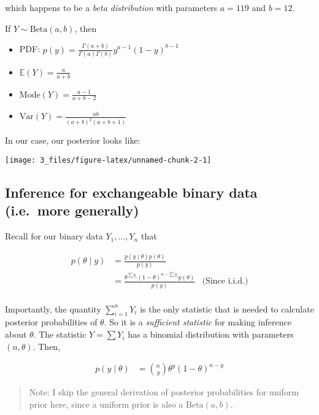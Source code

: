 \documentclass[]{article}
\providecommand{\tightlist}{%
  \setlength{\itemsep}{0pt}\setlength{\parskip}{0pt}}
\begin{document}
which happens to be a \emph{beta distribution} with parameters
\(a = 119\) and \(b = 12\).

If \(Y \sim \text{Beta}(a, b)\), then

\begin{itemize}
\tightlist
\item
  PDF:
  \(p(y) = \frac{\Gamma(a + b)}{\Gamma(a)\Gamma(b)} y^{a - 1} (1 - y)^{b - 1}\)
\item
  \(\mathbb{E}(Y) = \frac{a}{a + b}\)
\item
  \(\text{Mode}(Y) = \frac{a - 1}{a + b - 2}\)
\item
  \(\text{Var}(Y) = \frac{ab}{(a + b)^2 (a + b + 1)}\)
\end{itemize}

In our case, our posterior looks like:

\begin{center}\texttt{[image: 3\_files/figure-latex/unnamed-chunk-2-1]} \end{center}

\hypertarget{inference-for-exchangeable-binary-data-i.e.more-generally}{%
\subsection{Inference for exchangeable binary data (i.e.~more
generally)}\label{inference-for-exchangeable-binary-data-i.e.more-generally}}

Recall for our binary data \(Y_1, \dots, Y_n\) that

\begin{align}
p(\theta \mid y) &= \frac{p(y \mid \theta) p(\theta)}{p(y)} \\
&= \frac{\theta^{\sum y_i} (1 - \theta)^{n - \sum y_i} p(\theta)}{p(y)} & \text{(Since i.i.d.)} \\
\end{align}

Importantly, the quantity \(\sum_{i = 1}^n Y_i\) is the only statistic
that is needed to calculate posterior probabilities of \(\theta\). So it
is a \emph{sufficient statistic} for making inference about \(\theta\).
The statistic \(Y = \sum Y_i\) has a binomial distribution with
parameters \((n, \theta)\). Then,

\begin{align}
p(y \mid \theta) &= {n \choose y} \theta^y (1 - \theta)^{n - y}
\end{align}

\begin{quote}
Note: I skip the general derivation of posterior probabilities for
uniform prior here, since a uniform prior is also a
\(\text{Beta}(a, b)\).
\end{quote}
\end{document}
